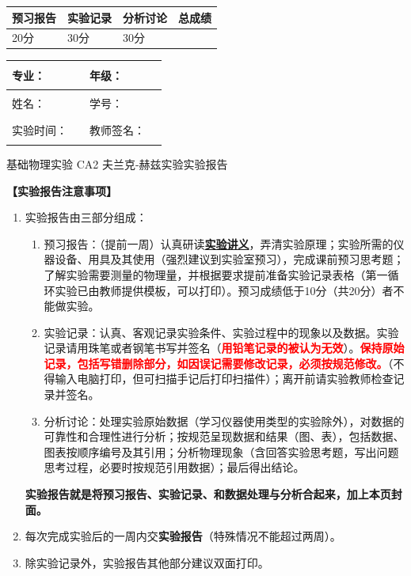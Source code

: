 \documentclass[dvipsnames, svgnames,a4paper,11pt]{article}
\begin{document}
\begin{table}
	\renewcommand\arraystretch{1.7}
	\begin{tabularx}{\textwidth}{
		|X|X|X|X
		|X|X|X|X|}
	\hline
	\multicolumn{2}{|c|}{预习报告}&\multicolumn{2}{|c|}{实验记录}&\multicolumn{2}{|c|}{分析讨论}&\multicolumn{2}{|c|}{总成绩}\\
	\hline
20分	& & 30分& & 30分& & & \\
	\hline
	\end{tabularx}
\end{table}


\begin{table}
	\renewcommand\arraystretch{1.7}
	\begin{tabularx}{\textwidth}{|X|X|X|X|}
	\hline
	专业：& \rule{2.5cm}{0.4pt} &年级：& \rule{2.5cm}{0.4pt} \\
	\hline
	姓名：& \rule{2.5cm}{0.4pt}   & 学号： & \rule{3cm}{0.4pt} \\
	\hline
	实验时间：& \rule{3cm}{0.4pt} & 教师签名：& \rule{3cm}{0.4pt} \\
	\hline
	\end{tabularx}
\end{table}

\begin{center}
	\LARGE 基础物理实验 \quad CA2 夫兰克-赫兹实验实验报告
\end{center}

\textbf{【实验报告注意事项】}
\begin{enumerate}
	\item 实验报告由三部分组成：
	\begin{enumerate}
		\item 预习报告：（提前一周）认真研读\underline{\textbf{实验讲义}}，弄清实验原理；实验所需的仪器设备、用具及其使用（强烈建议到实验室预习），完成课前预习思考题；了解实验需要测量的物理量，并根据要求提前准备实验记录表格（第一循环实验已由教师提供模板，可以打印）。预习成绩低于10分（共20分）者不能做实验。
	    \item 实验记录：认真、客观记录实验条件、实验过程中的现象以及数据。实验记录请用珠笔或者钢笔书写并签名（\textcolor{red}{\textbf{用铅笔记录的被认为无效}}）。\textcolor{red}{\textbf{保持原始记录，包括写错删除部分，如因误记需要修改记录，必须按规范修改。}}（不得输入电脑打印，但可扫描手记后打印扫描件）；离开前请实验教师检查记录并签名。
	    \item 分析讨论：处理实验原始数据（学习仪器使用类型的实验除外），对数据的可靠性和合理性进行分析；按规范呈现数据和结果（图、表），包括数据、图表按顺序编号及其引用；分析物理现象（含回答实验思考题，写出问题思考过程，必要时按规范引用数据）；最后得出结论。
	\end{enumerate}
	\textbf{实验报告就是将预习报告、实验记录、和数据处理与分析合起来，加上本页封面。}
	\item 每次完成实验后的一周内交\textbf{实验报告}（特殊情况不能超过两周）。
	\item 除实验记录外，实验报告其他部分建议双面打印。
\end{enumerate}
\end{document}
